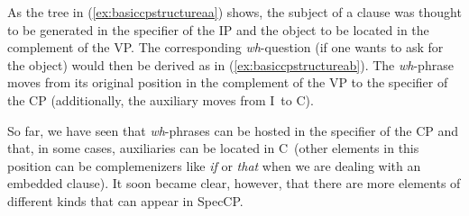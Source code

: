
\noindent As the tree in (\ref{ex:basiccpstructureaa}) shows, the subject of a clause was thought to be generated in the specifier of the IP and the object to be located in the complement of the VP. The corresponding \textit{wh}-question (if one wants to ask for the object) would then be derived as in (\ref{ex:basiccpstructureab}). The \textit{wh}-phrase moves from its original position in the complement of the VP to the specifier of the CP (additionally, the auxiliary moves from I\textdegree\ to C\textdegree ).

So far, we have seen that \textit{wh}-phrases can be hosted in the specifier of the CP and that, in some cases, auxiliaries can be located in C\textdegree\ (other elements in this position can be complemenizers like \textit{if} or \textit{that} when we are dealing with an embedded clause). It soon became clear, however, that there are more elements of different kinds that can appear in SpecCP.


